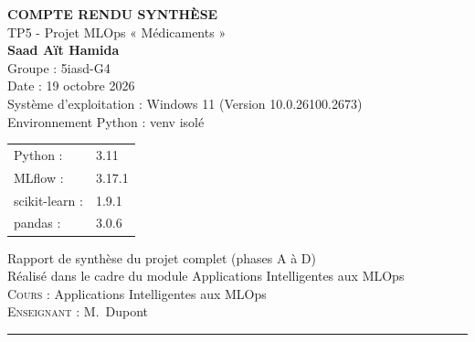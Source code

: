\documentclass[12pt,a4paper]{report}
\begin{document}
\begin{titlepage}
    \centering
    \vspace{2cm}
    
    {\LARGE \bfseries COMPTE RENDU SYNTHÈSE} \\
    \vspace{0.5cm}
    {\large TP5 - Projet MLOps « Médicaments »} \\
    \vspace{1cm}
    {\Large \textbf{Saad Aït Hamida}} \\
    \vspace{0.5cm}
    {\large Groupe : 5iasd-G4} \\
    \vspace{1cm}
    {\large Date : 19 octobre 2026} \\
    \vspace{0.5cm}
    {\large Système d'exploitation : Windows 11 (Version 10.0.26100.2673)} \\
    \vspace{0.5cm}
    {\large Environnement Python : venv isolé} \\
    \vspace{0.3cm}
    \begin{tabular}{ll}
        Python : & 3.11 \\
        MLflow : & 3.17.1 \\
        scikit-learn : & 1.9.1 \\
        pandas : & 3.0.6 \\
    \end{tabular}
    \vspace{2cm}
    
    {\large Rapport de synthèse du projet complet (phases A à D)} \\
    \vspace{0.5cm}
    {\large Réalisé dans le cadre du module Applications Intelligentes aux MLOps} \\
    
    \vfill
    {\large \textsc{Cours :} Applications Intelligentes aux MLOps} \\
    {\large \textsc{Enseignant :} M.~Dupont} \\
    
    \vspace{1cm}
    {\rule{0.8\textwidth}{0.5pt}}
\end{titlepage}

\setcounter{page}{1}
\end{document}
